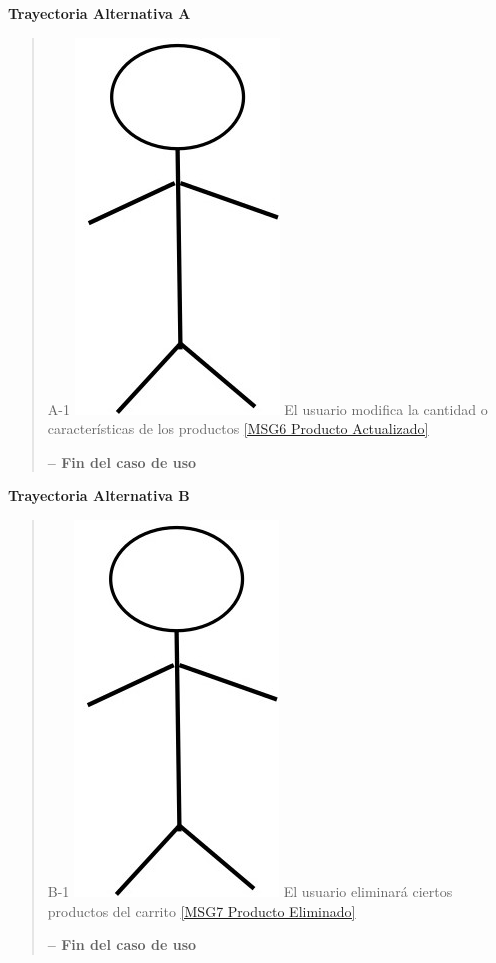 \documentclass[14pt]{article}
\begin{document}
                        
                \vspace{0.5cm}\textbf{Trayectoria Alternativa A}\label{CU-1.5 Trayectoria Alternativa A}
                    \begin{quote}
                        \item A-1  \includegraphics[height=0.02\textwidth]{Actor.jpg}
                            \label{Actor} El usuario modifica la cantidad o características de los productos \ref{MSG6 Producto Actualizado}
                        
                        \vspace{0.3cm}\textbf{-- Fin del caso de uso}
                    \end{quote}
                
                \vspace{0.5cm}\textbf{Trayectoria Alternativa B}\label{CU-1.5 Trayectoria Alternativa B}
                    \begin{quote}
                        \item B-1  \includegraphics[height=0.02\textwidth]{Actor.jpg}
                            \label{Actor} El usuario eliminará ciertos productos del carrito \ref{MSG7 Producto Eliminado}
                        
                        \vspace{0.3cm}\textbf{-- Fin del caso de uso}
                    \end{quote}
                   
            \newpage 
\end{document}
